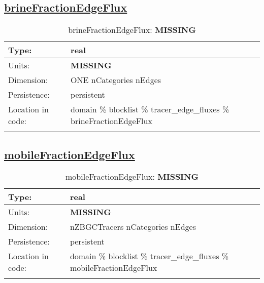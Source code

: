 \subsection[brineFractionEdgeFlux]{\hyperref[sec:var_tab_tracer_edge_fluxes]{brineFractionEdgeFlux}}
\label{subsec:var_sec_tracer_edge_fluxes_brineFractionEdgeFlux}
\begin{center}
\begin{longtable}{| p{2.0in} | p{4.0in} |}
        \hline 
        Type: & real \\
        \hline 
        Units: & {\bf \color{red} MISSING} \\
        \hline 
        Dimension: & ONE nCategories nEdges \\
        \hline 
        Persistence: & persistent \\
        \hline 
         Location in code: & domain \% blocklist \% tracer\_edge\_fluxes \% brineFractionEdgeFlux \\
         \hline 
    \caption{brineFractionEdgeFlux: {\bf \color{red} MISSING}}
\end{longtable}
\end{center}
\subsection[mobileFractionEdgeFlux]{\hyperref[sec:var_tab_tracer_edge_fluxes]{mobileFractionEdgeFlux}}
\label{subsec:var_sec_tracer_edge_fluxes_mobileFractionEdgeFlux}
\begin{center}
\begin{longtable}{| p{2.0in} | p{4.0in} |}
        \hline 
        Type: & real \\
        \hline 
        Units: & {\bf \color{red} MISSING} \\
        \hline 
        Dimension: & nZBGCTracers nCategories nEdges \\
        \hline 
        Persistence: & persistent \\
        \hline 
         Location in code: & domain \% blocklist \% tracer\_edge\_fluxes \% mobileFractionEdgeFlux \\
         \hline 
    \caption{mobileFractionEdgeFlux: {\bf \color{red} MISSING}}
\end{longtable}
\end{center}
